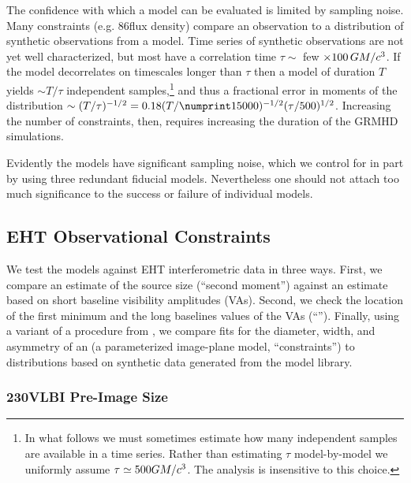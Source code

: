 The confidence with which a model can be evaluated is limited by sampling noise.
Many constraints (e.g. 86\GHz flux density) compare an observation to a distribution of synthetic observations from a model.
Time series of synthetic observations are not yet well characterized, but most have a correlation time $\tau\sim$ few $\times 100\,GM/c^3$.
If the model decorrelates on timescales longer than $\tau$ then a model of duration $T$ yields $\sim T/\tau$ independent samples,\footnote{In what follows we must sometimes estimate how many independent samples are available in a time series.
Rather than estimating $\tau$  model-by-model we uniformly assume $\tau \simeq 500 GM/c^3$.
The analysis is insensitive to this choice.} and thus a fractional error in moments of the distribution $\sim (T/\tau)^{-1/2} = 0.18 (T/\no{15000})^{-1/2}(\tau/500)^{1/2}$.
Increasing the number of constraints, then, requires increasing the duration of the GRMHD simulations.

Evidently the models have significant sampling noise, which we control for in part by using three redundant fiducial models.
Nevertheless one should not attach too much significance to the success or failure of individual models.

\subsection{EHT Observational Constraints}

We test the models against EHT interferometric data
in three ways.
First, we compare an estimate of the source size (``second moment'')
against an estimate based on short baseline visibility amplitudes
(VAs).
Second, we check the location of the first minimum and the long
baselines values of the VAs (``\vam'').
Finally, using a variant of a procedure from , we
compare fits for the diameter, width, and asymmetry of an \mring (a
parameterized image-plane model, ``\mring constraints'') to 
distributions based on synthetic data generated from the model library.

\subsubsection{230\GHz VLBI Pre-Image Size}
\label{sec:sz}

